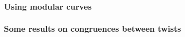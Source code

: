 \documentclass[compress]{beamer}
\begin{document}
\begin{frame}\frametitle{}
\end{frame}

\begin{frame}\frametitle{}
\end{frame}

\begin{frame}\frametitle{}
\end{frame}

\begin{frame}\frametitle{}
\end{frame}

\begin{frame}\frametitle{}
\end{frame}

\begin{frame}\frametitle{Using modular curves} %
\end{frame}

\begin{frame}\frametitle{Some results on congruences between twists}
\end{frame}
\end{document}
